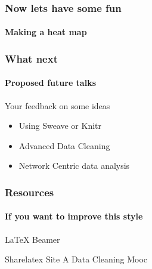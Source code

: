 \documentclass[12pt]{beamer}\usepackage[]{graphicx}\usepackage[]{color}
\begin{document}
\begin{frame}
  \frametitle{Now lets have some fun}
  \framesubtitle{Making a heat map}
\end{frame}

\begin{frame}
  \frametitle{What next}
  \framesubtitle{Proposed future talks}
  \begin{block}{Your feedback on some ideas}
  \begin{itemize}
  \item Using Sweave or Knitr
  \item Advanced Data Cleaning 
  \item Network Centric data analysis
  \end{itemize}
  \end{block}
\end{frame}

\begin{frame}
  \frametitle{Resources}
  \framesubtitle{If you want to improve this style}
  \begin{thebibliography}{10}

  \beamertemplatearticlebibitems
    LaTeX Beamer

  \bibitem{}
    Sharelatex Site %
  \bibitem{}
    A Data Cleaning Mooc %
  \end{thebibliography}
\end{frame}

%
%



%
%

\end{document}
